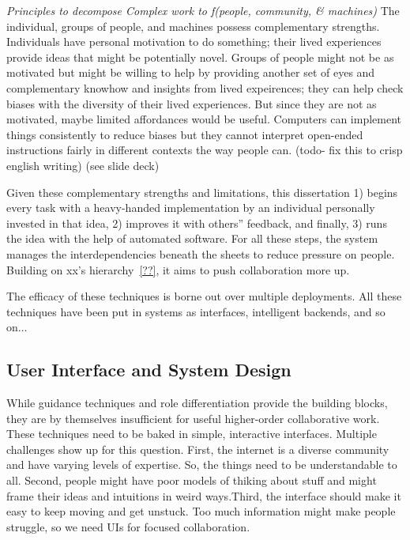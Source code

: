 \textit{Principles to decompose Complex work to f(people, community, \& machines)}
The individual, groups of people, and machines possess complementary strengths. Individuals have personal motivation to do something; their lived experiences provide ideas that might be potentially novel. Groups of people might not be as motivated but might be willing to help by providing another set of eyes and complementary knowhow and insights from lived expeirences; they can help check biases with the diversity of their lived experiences. But since they are not as motivated, maybe limited affordances would be useful. Computers can implement things consistently to reduce biases but they cannot interpret open-ended instructions fairly in different contexts the way people can.  (todo- fix this to crisp english writing) (see slide deck)

Given these complementary strengths and limitations, this dissertation 1) begins every task with a heavy-handed implementation by an individual personally invested in that idea, 2) improves it with others'' feedback, and finally, 3) runs the idea with the help of automated software. For all these steps, the system manages the interdependencies beneath the sheets to reduce pressure on people. Building on xx's hierarchy~\ref{??}, it aims to push collaboration more up.

The efficacy of these techniques is borne out over multiple deployments. All these techniques have been put in systems as interfaces, intelligent backends, and so on... \\


\subsection{User Interface and System Design}

While guidance techniques and role differentiation provide the building blocks, they are by themselves insufficient for useful higher-order collaborative work. These techniques need to be baked in simple, interactive interfaces. Multiple challenges show up for this question. First, the internet is a diverse community and have varying levels of expertise. So, the things need to be understandable to all. Second, people might have poor models of thiking about stuff and might frame their ideas and intuitions in weird ways.Third, the interface should make it easy to keep moving and get unstuck.  Too much information might make people struggle, so we need UIs for focused collaboration. 

